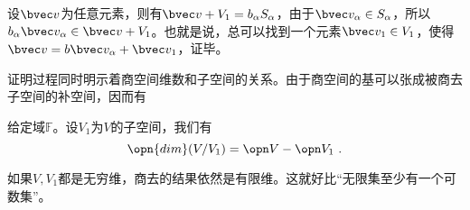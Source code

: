 设$\bvec v$为任意元素，则有$\bvec v+V_1=b_{\alpha} S_{\alpha}$，由于$\bvec v_{\alpha}\in S_{\alpha}$，所以$b_{\alpha} \bvec v_{\alpha}\in\bvec v+V_1$。也就是说，总可以找到一个元素$\bvec v_1\in V_1$，使得$\bvec v=b\bvec v_{\alpha}+\bvec v_1$，证毕。

证明过程同时明示着商空间维数和子空间的关系。由于商空间的基可以张成被商去子空间的补空间，因而有
\begin{theorem}{}
给定域$\mathbb F$。设$V_1$为$V$的子空间，我们有
\begin{equation}
\opn {dim}(V/V_1)=\opn V-\opn V_1~.
\end{equation}
\end{theorem}
如果$V,V_1$都是无穷维，商去的结果依然是有限维。这就好比“无限集至少有一个可数集”。